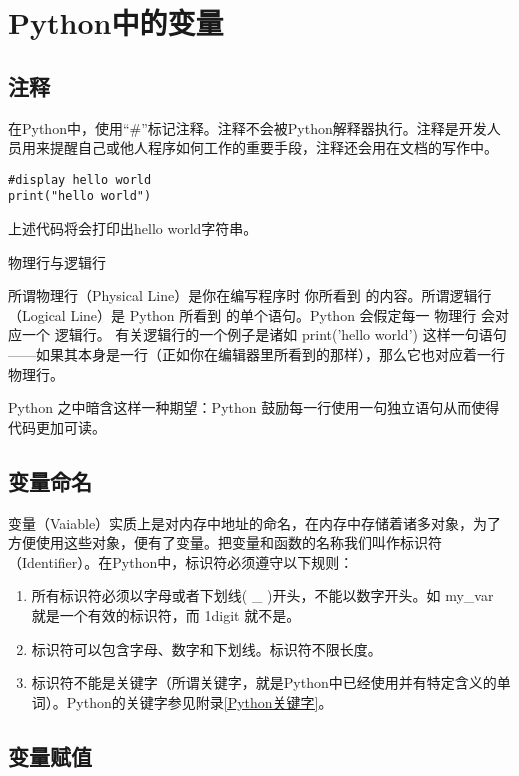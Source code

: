 \section{Python中的变量}

\subsection{注释}

在Python中，使用“\#”标记注释。注释不会被Python解释器执行。注释是开发人员用来提醒自己或他人程序如何工作的重要手段，注释还会用在文档的写作中。

\begin{lstlisting}
#display hello world
print("hello world")
\end{lstlisting}

上述代码将会打印出hello world字符串。


\begin{myremark}{物理行与逻辑行}

所谓物理行（Physical Line）是你在编写程序时 你所看到 的内容。所谓逻辑行（Logical Line）是 Python 所看到 的单个语句。Python 会假定每一 物理行 会对应一个 逻辑行。
有关逻辑行的一个例子是诸如 print('hello world') 这样一句语句——如果其本身是一行（正如你在编辑器里所看到的那样），那么它也对应着一行物理行。

Python 之中暗含这样一种期望：Python 鼓励每一行使用一句独立语句从而使得代码更加可读。
\end{myremark}
\subsection{变量命名}

变量（Vaiable）实质上是对内存中地址的命名，在内存中存储着诸多对象，为了方便使用这些对象，便有了变量。把变量和函数的名称我们叫作标识符（Identifier）。在Python中，标识符必须遵守以下规则：

\begin{enumerate}
	\item 所有标识符必须以字母或者下划线( \_ )开头，不能以数字开头。如 my\_var 就是一个有效的标识符，而 1digit 就不是。
	\item 标识符可以包含字母、数字和下划线。标识符不限长度。
	\item 标识符不能是关键字（所谓关键字，就是Python中已经使用并有特定含义的单词）。Python的关键字参见附录\ref{Python关键字}。
\end{enumerate}

\subsection{变量赋值}

